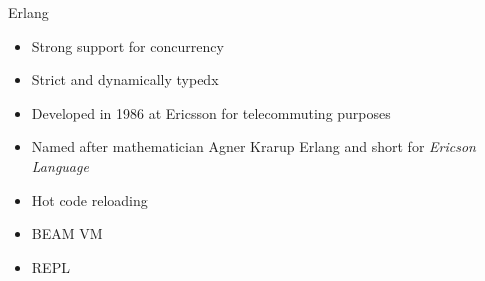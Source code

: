 \documentclass[pdf]{beamer}
\begin{document}
\begin{frame}{Erlang}
  \begin{figure}[H]
    \centering
    \hspace{0.2cm}
  \end{figure}
  \begin{itemize}
  \item Strong support for concurrency
  \item Strict and dynamically typedx
  \item Developed in 1986 at Ericsson for telecommuting purposes
  \item Named after mathematician Agner Krarup Erlang and short for \emph{Ericson Language}
  \item Hot code reloading
  \item BEAM VM
  \item REPL
  \end{itemize}
\end{frame}
\end{document}
